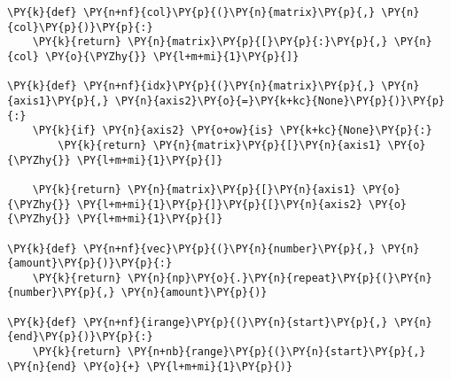 \begin{tcolorbox}[breakable, size=fbox, boxrule=1pt, pad at break*=1mm,colback=cellbackground, colframe=cellborder]
    \begin{Verbatim}[commandchars=\\\{\}]
\PY{k}{def} \PY{n+nf}{col}\PY{p}{(}\PY{n}{matrix}\PY{p}{,} \PY{n}{col}\PY{p}{)}\PY{p}{:}
    \PY{k}{return} \PY{n}{matrix}\PY{p}{[}\PY{p}{:}\PY{p}{,} \PY{n}{col} \PY{o}{\PYZhy{}} \PY{l+m+mi}{1}\PY{p}{]}

\PY{k}{def} \PY{n+nf}{idx}\PY{p}{(}\PY{n}{matrix}\PY{p}{,} \PY{n}{axis1}\PY{p}{,} \PY{n}{axis2}\PY{o}{=}\PY{k+kc}{None}\PY{p}{)}\PY{p}{:}
    \PY{k}{if} \PY{n}{axis2} \PY{o+ow}{is} \PY{k+kc}{None}\PY{p}{:}
        \PY{k}{return} \PY{n}{matrix}\PY{p}{[}\PY{n}{axis1} \PY{o}{\PYZhy{}} \PY{l+m+mi}{1}\PY{p}{]}

    \PY{k}{return} \PY{n}{matrix}\PY{p}{[}\PY{n}{axis1} \PY{o}{\PYZhy{}} \PY{l+m+mi}{1}\PY{p}{]}\PY{p}{[}\PY{n}{axis2} \PY{o}{\PYZhy{}} \PY{l+m+mi}{1}\PY{p}{]}

\PY{k}{def} \PY{n+nf}{vec}\PY{p}{(}\PY{n}{number}\PY{p}{,} \PY{n}{amount}\PY{p}{)}\PY{p}{:}
    \PY{k}{return} \PY{n}{np}\PY{o}{.}\PY{n}{repeat}\PY{p}{(}\PY{n}{number}\PY{p}{,} \PY{n}{amount}\PY{p}{)}

\PY{k}{def} \PY{n+nf}{irange}\PY{p}{(}\PY{n}{start}\PY{p}{,} \PY{n}{end}\PY{p}{)}\PY{p}{:}
    \PY{k}{return} \PY{n+nb}{range}\PY{p}{(}\PY{n}{start}\PY{p}{,} \PY{n}{end} \PY{o}{+} \PY{l+m+mi}{1}\PY{p}{)}
    \end{Verbatim}
\end{tcolorbox}

\pagebreak

